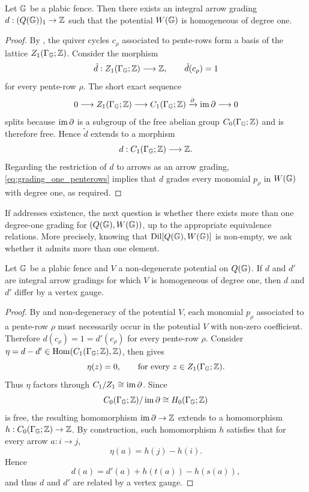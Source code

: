 \begin{lemma}\label{prop:existence}
Let $\mathbb G$ be a plabic fence. Then there exists an integral arrow grading $d:(Q(\mathbb G))_1\to\mathbb Z$ such that the potential $W(\mathbb G)$ is homogeneous of degree one.
\end{lemma}
\begin{proof}
By , the quiver cycles $c_\rho$ associated to pente-rows form a basis of the lattice $Z_1(\Gamma_\mathbb G;\mathbb Z)$. Consider the morphism
\begin{equation}\label{eq:grading_one_penterows}
\tilde{d}:Z_1(\Gamma_\mathbb G;\mathbb Z)\longrightarrow\mathbb Z,
\qquad
\tilde{d}(c_\rho)=1
\end{equation}
for every pente-row $\rho$. The short exact sequence
\[
0\longrightarrow Z_1(\Gamma_\mathbb G;\mathbb Z)
\longrightarrow C_1(\Gamma_\mathbb G;\mathbb Z)
\xrightarrow{\partial}\operatorname{im}\partial
\longrightarrow0
\]
splits because $\operatorname{im}\partial$ is a subgroup of the free abelian group $C_0(\Gamma_\mathbb G;\mathbb Z)$ and is therefore free.  Hence $\tilde{d}$ extends to a morphism
\[
d:C_1(\Gamma_\mathbb G;\mathbb Z)\longrightarrow\mathbb Z.
\]
Regarding the restriction of $d$ to arrows as an arrow grading, \eqref{eq:grading_one_penterows} implies that $d$ grades every monomial $p_\rho$ in $W(\mathbb G)$ with degree one, as required.
\end{proof}

\noindent If  addresses existence, the next question is whether there exists more than one degree-one grading for $(Q(\mathbb G),W(\mathbb G))$, up to the appropriate equivalence relations. More precisely, knowing that $\operatorname{Dil}[Q(\mathbb G),W(\mathbb G)]$ is non-empty, we ask whether it admits more than one element.

\begin{proposition}\label{prop:gauge-unique}
Let $\mathbb G$ be a plabic fence and $V$ a non-degenerate potential on $Q(\mathbb G)$. If $d$ and $d'$ are integral arrow gradings for which $V$ is homogeneous of degree one, then $d$ and $d'$ differ by a vertex gauge.
\end{proposition}

\begin{proof}
By \cite[Lemma~3.13]{CasalsGao} and non-degeneracy of the potential $V$, each monomial $p_\rho$ associated to a pente-row $\rho$ must necessarily occur in the potential $V$ with non-zero coefficient. Therefore $d(c_\rho)=1=d'(c_\rho)$ for every pente-row $\rho$. Consider $\eta=d-d'\in\operatorname{Hom}(C_1(\Gamma_\mathbb G;\mathbb Z),\mathbb Z)$, then  gives
\[
\eta(z)=0,
\qquad
\text{for every }z\in Z_1(\Gamma_\mathbb G;\mathbb Z).
\]
Thus $\eta$ factors through $C_1/Z_1\cong\operatorname{im}\partial$.  Since
\[
C_0(\Gamma_\mathbb G;\mathbb Z)/\operatorname{im}\partial\cong H_0(\Gamma_\mathbb G;\mathbb Z)
\]
is free, the resulting homomorphism $\operatorname{im}\partial\to\mathbb Z$ extends to a homomorphism $h:C_0(\Gamma_\mathbb G;\mathbb Z)\to\mathbb Z$. By construction, such homomorphism $h$ satisfies that for every arrow $a:i\to j$,
\[
\eta(a)=h(j)-h(i).
\]
Hence
\[
d(a)=d'(a)+h(t(a))-h(s(a)),
\]
and thus $d$ and $d'$ are related by a vertex gauge.
\end{proof}

